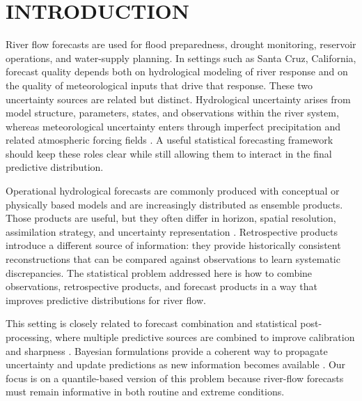 \documentclass[APA,STIX1COL]{WileyNJD-v2}
\begin{document}
\section{INTRODUCTION}

River flow forecasts are used for flood preparedness, drought monitoring, reservoir operations, and water-supply planning. In settings such as Santa Cruz, California, forecast quality depends both on hydrological modeling of river response and on the quality of meteorological inputs that drive that response. These two uncertainty sources are related but distinct. Hydrological uncertainty arises from model structure, parameters, states, and observations within the river system, whereas meteorological uncertainty enters through imperfect precipitation and related atmospheric forcing fields \citep{tarek2021daily, thiboult2016accounting, kim2019hybrid, haiden2021evaluation}. A useful statistical forecasting framework should keep these roles clear while still allowing them to interact in the final predictive distribution.

Operational hydrological forecasts are commonly produced with conceptual or physically based models and are increasingly distributed as ensemble products. Those products are useful, but they often differ in horizon, spatial resolution, assimilation strategy, and uncertainty representation \citep{molteni1996ecmwf, isaksen2010ensemble, demargne2013science, barlage2021importance, johnson2023comprehensive}. Retrospective products introduce a different source of information: they provide historically consistent reconstructions that can be compared against observations to learn systematic discrepancies. The statistical problem addressed here is how to combine observations, retrospective products, and forecast products in a way that improves predictive distributions for river flow.

This setting is closely related to forecast combination and statistical post-processing, where multiple predictive sources are combined to improve calibration and sharpness \citep{siegert2019forecast, vannitsem, wang2022forecastcombinations50yearreview}. Bayesian formulations provide a coherent way to propagate uncertainty and update predictions as new information becomes available \citep{duan2006bma, yumnam2022quantile, aastveit2022quantifying, du2018ensemble_forecasting, doubleday, kleiber2011geostatistical, mcalinn2019dynamic, tallman2023bayesianpredictivedecisionsynthesis, johnson2023bayesian}. Our focus is on a quantile-based version of this problem because river-flow forecasts must remain informative in both routine and extreme conditions.
\end{document}

